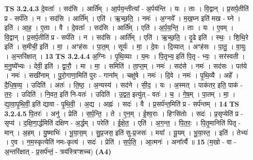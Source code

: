 \documentclass[17pt]{extarticle}
\begin{document}
                  \newline
                                \textbf{ TS 3.2.4.3} \newline
                  दे॒वताः᳚ । सद॑सि । आर्ति᳚म् । आ॒र्पय॒न्तीत्या᳚ - अ॒र्पय॑न्ति । यः । ताः । वि॒द्वान् । प्र॒सर्प॒तीति॑ प्र - सर्प॑ति । न । सद॑सि । आर्ति᳚म् । एति॑ । ऋ॒च्छ॒ति॒ । नमः॑ । अ॒ग्नये᳚ । म॒ख॒घ्न इति॑ मख - घ्ने । इति॑ । आ॒ह॒ । ए॒ताः । वै । दे॒वताः᳚ । सद॑सि । आर्ति᳚म् । एति॑ । अ॒र्प॒य॒न्ति॒ । ताः । यः । ए॒वम् । वि॒द्वान् । प्र॒सर्प॒तीति॑ प्र - सर्प॑ति । न । सद॑सि । आर्ति᳚म् । एति॑ । ऋ॒च्छ॒ति॒ । दृ॒ढे इति॑ । स्थः॒ । शि॒थि॒रे इति॑ । स॒मीची॒ इति॑ । मा॒ । अꣳह॑सः । पा॒त॒म् । सूर्यः॑ । मा॒ । दे॒वः । दि॒व्यात् । अꣳह॑सः । पा॒तु॒ । वा॒युः । अ॒न्तरि॑क्षात् । \textbf{  13} \newline
                  \newline
                                \textbf{ TS 3.2.4.4} \newline
                  अ॒ग्निः । पृ॒थि॒व्याः । य॒मः । पि॒तृभ्य॒ इति॑ पि॒तृ - भ्यः॒ । सर॑स्वती । म॒नु॒ष्ये᳚भ्यः । देवी॒ इति॑ । द्वा॒रौ॒ । मा । मा॒ । समिति॑ । ता॒प्त॒म् । नमः॑ । सद॑से । नमः॑ । सद॑सः । पत॑ये । नमः॑ । सखी॑नाम् । पु॒रो॒गाणा॒मिति॑ पुरः - गाना᳚म् । चक्षु॑षे । नमः॑ । दि॒वे । नमः॑ । पृ॒थि॒व्यै । अहे᳚ । दै॒धि॒ष॒व्य॒ । उदिति॑ । अतः॑ । ति॒ष्ठ॒ । अ॒न्यस्य॑ । सद॑ने । सी॒द॒ । यः । अ॒स्मत् । पाक॑तर॒ इति॒ पाक॑ - त॒रः॒ । उदिति॑ । नि॒वत॒ इति॑ नि-वतः॑ । उदिति॑ । उ॒द्वत॒ इत्यु॑त् - वतः॑ । च॒ । गे॒ष॒म् । पा॒तम् । मा॒ । द्या॒वा॒पृ॒थि॒वी॒ इति॑ द्यावा - पृ॒थि॒वी॒ । अ॒द्य । अह्नः॑ । सदः॑ । वै । प्र॒सर्प॑न्त॒मिति॑ प्र - सर्प॑न्तम् । \textbf{  14} \newline
                  \newline
                                \textbf{ TS 3.2.4.5} \newline
                  पि॒तरः॑ । अनु॑ । प्रेति॑ । स॒र्प॒न्ति॒ । ते । ए॒न॒म् । ई॒श्व॒राः । हिꣳसि॑तोः । सदः॑ । प्र॒सृप्येति॑ प्र - सृप्य॑ । द॒क्षि॒णा॒र्द्धमिति॑ दक्षिण - अ॒र्द्धम् । परेति॑ । ई॒क्षे॒त॒ । एति॑ । अ॒ग॒न्त॒ । पि॒त॒रः॒ । पि॒तृ॒मानिति॑ पितृ - मान् । अ॒हम् । यु॒ष्माभिः॑ । भू॒या॒स॒म् । सु॒प्र॒जस॒ इति॑ सु-प्र॒जसः॑ । मया᳚ । यू॒यम् । भू॒या॒स्त॒ । इति॑ । तेभ्यः॑ । ए॒व । न॒म॒स्कृत्येति॑ नमः-कृत्य॑ । सदः॑ । प्रेति॑ । स॒र्प॒ति॒ । आ॒त्मनः॑ । अना᳚र्त्यै ॥ \textbf{  15} \newline
                  \newline
                      (म॒खो - वा - अ॒न्तरि॑क्षात् - प्र॒सर्प॑न्तं॒ - त्रय॑स्त्रिꣳशच्च)  \textbf{(A4)} \newline \newline
\end{document}
